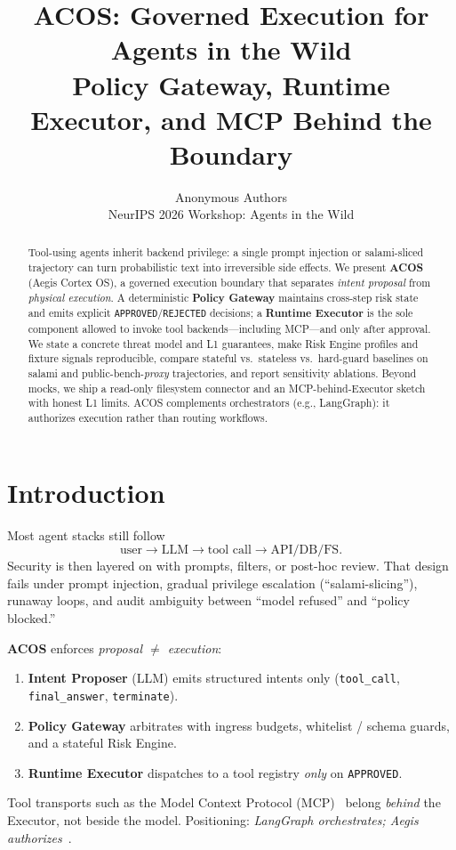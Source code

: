 \documentclass{article}
\title{ACOS: Governed Execution for Agents in the Wild\\
\large Policy Gateway, Runtime Executor, and MCP Behind the Boundary}
\author{
  Anonymous Authors\\
  NeurIPS 2026 Workshop: Agents in the Wild\\
}
\begin{document}
\maketitle

\begin{abstract}
Tool-using agents inherit backend privilege: a single prompt injection or
salami-sliced trajectory can turn probabilistic text into irreversible side
effects. We present \textbf{ACOS} (Aegis Cortex OS), a governed execution
boundary that separates \emph{intent proposal} from \emph{physical execution}.
A deterministic \textbf{Policy Gateway} maintains cross-step risk state and
emits explicit \texttt{APPROVED}/\texttt{REJECTED} decisions; a
\textbf{Runtime Executor} is the sole component allowed to invoke tool
backends---including MCP---and only after approval. We state a concrete
threat model and L1 guarantees, make Risk Engine profiles and fixture signals
reproducible, compare stateful vs.\ stateless vs.\ hard-guard baselines on
salami and public-bench-\emph{proxy} trajectories, and report sensitivity
ablations. Beyond mocks, we ship a read-only filesystem connector and an
MCP-behind-Executor sketch with honest L1 limits. ACOS complements
orchestrators (e.g., LangGraph): it authorizes execution rather than routing
workflows.
\end{abstract}

\section{Introduction}
\label{sec:intro}

Most agent stacks still follow
\[
\text{user} \rightarrow \text{LLM} \rightarrow \text{tool call} \rightarrow \text{API/DB/FS}.
\]
Security is then layered on with prompts, filters, or post-hoc review. That
design fails under prompt injection, gradual privilege escalation
(``salami-slicing''), runaway loops, and audit ambiguity between ``model
refused'' and ``policy blocked.''

\textbf{ACOS} enforces \emph{proposal $\neq$ execution}:
\begin{enumerate}
  \item \textbf{Intent Proposer} (LLM) emits structured intents only
        (\texttt{tool\_call}, \texttt{final\_answer}, \texttt{terminate}).
  \item \textbf{Policy Gateway} arbitrates with ingress budgets, whitelist /
        schema guards, and a stateful Risk Engine.
  \item \textbf{Runtime Executor} dispatches to a tool registry
        \emph{only} on \texttt{APPROVED}.
\end{enumerate}
Tool transports such as the Model Context Protocol (MCP)~\citep{mcp2024}
belong \emph{behind} the Executor, not beside the model. Positioning:
\emph{LangGraph orchestrates; Aegis authorizes}~\citep{langgraph,acos2026}.
\end{document}
